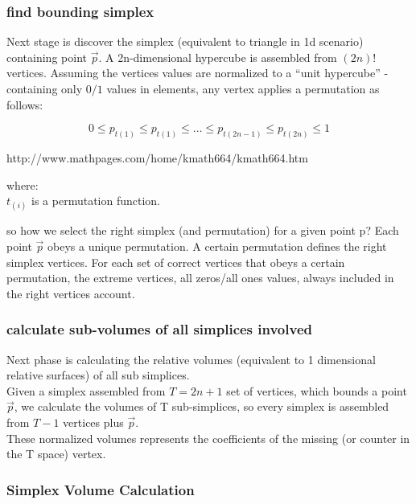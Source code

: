 \begin{}
		\subsubsection{find bounding simplex}
		
		Next stage is discover the simplex (equivalent to triangle in 1d scenario) containing point $\overrightarrow{p}$.
		A 2n-dimensional hypercube is assembled from $(2n)!$ vertices. 
		Assuming the vertices values are normalized to a “unit hypercube” - containing only $0/1$ values in elements, any vertex applies a permutation as follows:
		
		\begin{equation}
		0 \leq p_{t(1)} \leq p_{t(1)} \leq \dots \leq p_{t(2n-1)} \leq p_{t(2n)} \leq 1
		\end{equation}
		
		http://www.mathpages.com/home/kmath664/kmath664.htm
		
		
		where:\\
		$t_{(i)}$ is a permutation function.
		
		so how we select the right simplex (and permutation) for a given point p?
		Each point $\overrightarrow{p}$ obeys a unique permutation. 
		A certain permutation defines the right simplex vertices. 
		For each set of correct vertices that obeys a certain permutation, the extreme vertices, all zeros/all ones values, always included in the right vertices account. 
		
		
		
		\subsubsection{calculate sub-volumes of all simplices involved}
		
		Next phase is calculating the relative volumes (equivalent to 1 dimensional relative surfaces) of all sub simplices. 
		\\Given a simplex assembled from $T = 2n+1$ set of vertices, which bounds a point $\overrightarrow{p}$, we calculate the volumes of T sub-simplices, so every simplex is assembled from $T-1$ vertices plus $\overrightarrow{p}$. 
		\\These normalized volumes represents the coefficients of the missing (or counter in the T space) vertex.
		
		
		
		\subsubsection{Simplex Volume Calculation}
		

\end{}
